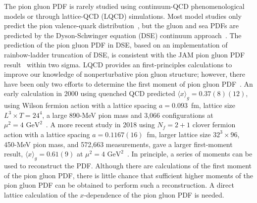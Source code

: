 The pion gluon PDF is rarely studied using continuum-QCD phenomenological models or through lattice-QCD (LQCD) simulations.
Most model studies only predict the pion valence-quark distribution~\cite{Nam:2012vm,Watanabe:2016lto,Watanabe:2017pvl,Hutauruk:2016sug,Lan:2019vui,Lan:2019rba,deTeramond:2018ecg,Watanabe:2019zny,Han:2018wsw,Chang:2014lva,Chang:2014gga,Chen:2016sno,Shi:2018mcb,Bednar:2018mtf,Ding:2019lwe},
but the gluon and sea PDFs are predicted by the Dyson-Schwinger equation (DSE) continuum approach~\cite{Freese:2021zne}. The prediction of the pion gluon PDF in DSE, based on an implementation of rainbow-ladder truncation of DSE, is consistent with the JAM pion gluon PDF result~\cite{Barry:2018ort,Cao:2021aci} within two sigma.
LQCD provides an first-principles calculations to improve our knowledge of nonperturbative pion gluon structure;
however, there have been only two efforts to determine the first moment of pion gluon PDF~\cite{Meyer:2007tm,Shanahan:2018pib}.
An early calculation in 2000 using quenched QCD predicted $\langle x \rangle_g=0.37(8)(12)$, using Wilson fermion action with a lattice spacing $a=0.093$~fm, lattice size $L^3\times T=24^4$, a large 890-MeV pion mass and 3,066 configurations at $\mu^2=4\text{ GeV}^2$~\cite{Meyer:2007tm}.
A more recent study in 2018 using $N_f=2+1$ clover fermion action  with a lattice spacing $a=0.1167(16)$~fm, larger lattice size $32^3\times 96$, 450-MeV pion mass, and 572,663 measurements, gave a larger first-moment result, $\langle x \rangle_g=0.61(9)$ at $\mu^2=4\text{ GeV}^2$~\cite{Shanahan:2018pib}.
%
In principle, a series of moments can be used to reconstruct the PDF.
Although there are calculations of the first moment of the pion gluon PDF, there is little chance that sufficient higher moments of the pion gluon PDF can be obtained to perform such a reconstruction.
A direct lattice calculation of the $x$-dependence of the pion gluon PDF is needed.


